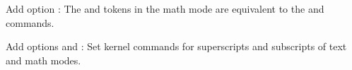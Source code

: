 \documentclass[load-preamble+]{cnltx-doc}
\begin{document}
\appendix
\begin{changelog}[simple]
  \begin{version}[v = 1.46j,date = 2024/05/19]
  \item Add option : The \code{\^{}} and \code{\_{}} tokens in the math mode are equivalent to the  and  commands.
  \end{version}
  \begin{version}[v = 1.46k,date = 2024/06/21]
  \item Add options  and : Set kernel commands for superscripts and subscripts of text and math modes.
  \end{version}
\end{changelog}
\nocite{*}
\end{document}
